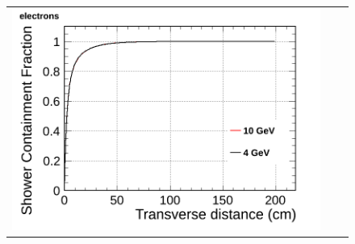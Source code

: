 \begin{figure}[htp]
\begin{tabular}{ccc}
    \includegraphics[scale=0.15]{figures/electrons_wcont_overlay}\\
 

\end{tabular}
\end{figure}
